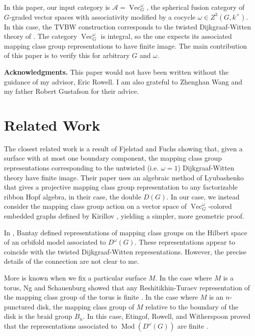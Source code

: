 \documentclass{amsart}
\DeclareMathOperator{\Mod}{Mod}
\DeclareMathOperator{\Vect}{Vec}
\begin{document}
In this paper, our input category is  $\mathcal A = \Vect_G^\omega$, the spherical fusion category of $G$-graded vector spaces with associativity modified by a cocycle $\omega \in Z^3(G, k^\times)$.  In this case, the TVBW construction corresponds to the twisted Dijkgraaf-Witten theory of \cite{dijkgraaf1990}.  The category $\Vect_G^\omega$ is integral, so the one expects its associated mapping class group representations to have finite image.  The main contribution of this paper is to verify this for arbitrary $G$ and $\omega$.

\textbf{Acknowledgments.}  This paper would not have been written without the guidance of my advisor, Eric Rowell.  I am also grateful to Zhenghan Wang and my father Robert Gustafson for their advice.

\section{Related Work}

The closest related work is a result of Fjelstad and Fuchs \cite{fjfu} showing that, given a surface with at most one boundary component, the mapping class group representations corresponding to the untwisted (i.e. $\omega = 1$) Dijkgraaf-Witten theory have finite image.  Their paper uses an algebraic method of Lyubashenko \cite{Lyubashenko1996} that gives a projective mapping class group representation to any factorizable ribbon Hopf algebra, in their case, the double $D(G)$. In our case, we instead consider the mapping class group action on a vector space of $\Vect_G^\omega$-colored embedded graphs defined by Kirillov \cite{kirillovStringNets}, yielding a simpler, more geometric proof.

In \cite{bantay}, Bantay defined representations of mapping class groups on the Hilbert space of an orbifold model associated to $D^\omega(G)$.  These representations appear to coincide with the twisted Dijkgraaf-Witten representations. However, the precise details of the connection are not clear to me.

More is known when we fix a particular surface $M$. In the case where $M$ is a torus, Ng and Schauenburg showed that any Reshitikhin-Turaev representation of the mapping class group of the torus is finite \cite{0806.2493}.   In the case where $M$ is an $n$-punctured disk, the mapping class group of $M$ relative to the boundary of the disk is the braid group $B_n$.  In this case, Etingof, Rowell, and Witherspoon proved that the representations associated to $\Mod(D^\omega(G))$ are finite \cite{erw}.
\end{document}
